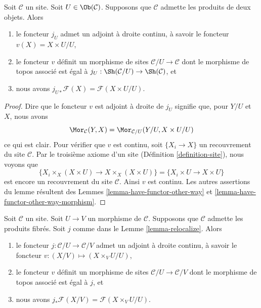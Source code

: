 \begin{lemma}
\label{lemma-localize-given-products}
Soit $\mathcal{C}$ un site.
Soit $U \in \Ob(\mathcal{C})$.
Supposons que $\mathcal{C}$ admette les produits de deux objets.
Alors
\begin{enumerate}
\item le foncteur $j_U$ admet un adjoint à droite continu,
à savoir le foncteur $v(X) = X \times U / U$,
\item le foncteur $v$ définit un morphisme de sites
$\mathcal{C}/U \to \mathcal{C}$ dont le morphisme de topos associé est égal à
$j_U : \Sh(\mathcal{C}/U) \to \Sh(\mathcal{C})$, et
\item nous avons $j_{U*}\mathcal{F}(X) = \mathcal{F}(X \times U/U)$.
\end{enumerate}
\end{lemma}

\begin{proof}
Dire que le foncteur $v$ est adjoint à droite de $j_U$ signifie que, pour $Y/U$ et $X$,
nous avons
$$
\Mor_\mathcal{C}(Y, X)
=
\Mor_{\mathcal{C}/U}(Y/U, X \times U/U)
$$
ce qui est clair. Pour vérifier que $v$ est continu, soit $\{X_i \to X\}$
un recouvrement du site $\mathcal{C}$. Par le troisième axiome d’un site
(Définition \ref{definition-site}),
nous voyons que
$$
\{X_i \times_X (X \times U) \to X \times_X (X \times U)\}
=
\{X_i \times U \to X \times U\}
$$
est encore un recouvrement du site $\mathcal{C}$. Ainsi $v$ est continu. Les autres
assertions du lemme résultent des Lemmes \ref{lemma-have-functor-other-way}
et \ref{lemma-have-functor-other-way-morphism}.
\end{proof}

\begin{lemma}
\label{lemma-relocalize-given-fibre-products}
Soit $\mathcal{C}$ un site. Soit $U \to V$ un morphisme de $\mathcal{C}$.
Supposons que $\mathcal{C}$ admette les produits fibrés. Soit $j$ comme dans le
Lemme \ref{lemma-relocalize}. Alors
\begin{enumerate}
\item le foncteur $j : \mathcal{C}/U \to \mathcal{C}/V$
admet un adjoint à droite continu, à savoir le foncteur
$v : (X/V) \mapsto (X \times_V U/U)$,
\item le foncteur $v$ définit un morphisme de sites
$\mathcal{C}/U \to \mathcal{C}/V$ dont le morphisme de topos associé est égal à
$j$, et
\item nous avons $j_*\mathcal{F}(X/V) = \mathcal{F}(X \times_V U/U)$.
\end{enumerate}
\end{lemma}

